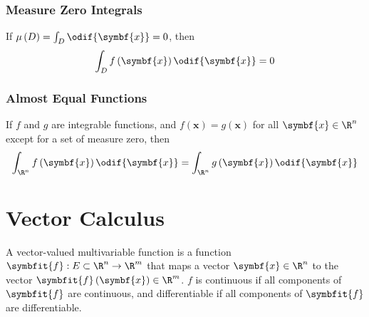 \documentclass{article}
\begin{document}
\subsubsection*{Measure Zero Integrals}
If \(\mu\left( D \right) = \int_D \odif{\symbf{x}} = 0\), then
\begin{equation*}
    \int_D f\left( \symbf{x} \right) \odif{\symbf{x}} = 0
\end{equation*}
\subsubsection*{Almost Equal Functions}
If \(f\) and \(g\) are integrable functions, and \(f\left( \symbf{x}
\right) = g\left( \symbf{x} \right)\) for all \(\symbf{x} \in \R^n\)
except for a set of measure zero, then
\begin{equation*}
    \int_{\R^n} f\left( \symbf{x} \right) \odif{\symbf{x}} = \int_{\R^n} g\left( \symbf{x} \right) \odif{\symbf{x}}
\end{equation*}
\section{Vector Calculus}
A vector-valued multivariable function is a function \(\symbfit{f} : E
\subset \R^n \to \R^m\) that maps a vector \(\symbf{x} \in \R^n\) to
the vector \(\symbfit{f}\left( \symbf{x} \right) \in \R^m\). \(f\) is
continuous if all components of \(\symbfit{f}\) are continuous, and
differentiable if all components of \(\symbfit{f}\) are differentiable.
\end{document}
